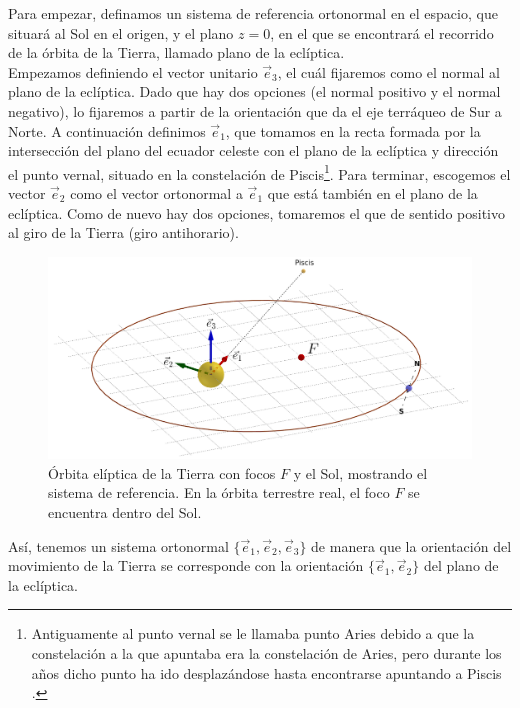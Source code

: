 \documentclass[11pt]{book}
\begin{document}
Para empezar, definamos un sistema de referencia ortonormal en el espacio, que situará al Sol en el origen, y el plano $z=0$, en el que se encontrará el recorrido de la órbita de la Tierra, llamado plano de la eclíptica.\\

Empezamos definiendo el vector unitario $\vec{e}_3$, el cuál fijaremos como el normal al plano de la eclíptica. Dado que hay dos opciones (el normal positivo y el normal negativo), lo fijaremos a partir de la orientación que da el eje terráqueo de Sur a Norte. A continuación definimos $\vec{e}_1$, que tomamos en la recta formada por la intersección del plano del ecuador celeste con el plano de la eclíptica y dirección el punto vernal, situado en la constelación de Piscis\footnote{Antiguamente al punto vernal se le llamaba punto Aries debido a que la constelación a la que apuntaba era la constelación de Aries, pero durante los años dicho punto ha ido desplazándose hasta encontrarse apuntando a Piscis \cite{piscis}.}. Para terminar, escogemos el vector $\vec{e}_2$ como el vector ortonormal a $\vec{e}_1$ que está también en el plano de la eclíptica. Como de nuevo hay dos opciones, tomaremos el que de sentido positivo al giro de la Tierra (giro antihorario).\\

\begin{figure}[H]
\centering
\includegraphics[scale=0.3]{images/sistema_coordenadas.png}
\caption{Órbita elíptica de la Tierra con focos $F$ y el Sol, mostrando el sistema de referencia. En la órbita terrestre real, el foco $F$ se encuentra dentro del Sol.}
\label{fig:sistema_referencia}
\end{figure}

Así, tenemos un sistema ortonormal $\{\vec{e}_1,\vec{e}_2,\vec{e}_3\}$ de manera que la orientación del movimiento de la Tierra se corresponde con la orientación $\{\vec{e}_1,\vec{e}_2\}$ del plano de la eclíptica.\\
\end{document}
